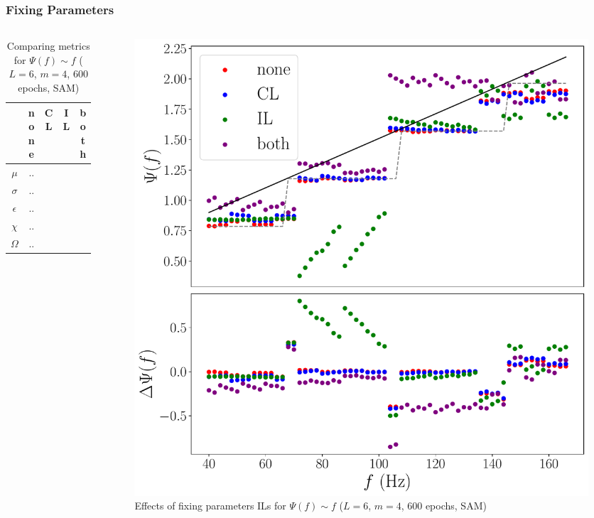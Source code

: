 \documentclass{beamer}
\begin{document}
\begin{frame}
\frametitle{Fixing Parameters}
\begin{columns}
\begin{column}{0.5\textwidth}
\begin{table}
\begin{tabular}{c || c| c | c| c }
&none & CL & IL & both \\ \hline \hline 
$\mu$ & ..   \\
$\sigma$ & ..  \\
$\epsilon$  & .. \\
$\chi$ & .. \\ \hline 
$\Omega$ & .. 
\end{tabular}
\caption{Comparing metrics for $\Psi(f) \sim f$ ($L=6$, $m=4$, 600 epochs, SAM)}
\end{table}
\end{column}
\begin{column}{0.5\textwidth}
\begin{figure}
\centering 
\includegraphics[width=\textwidth]{im/phase_RP_comp_linear_m4}
\caption{Effects of fixing parameters ILs for $\Psi(f) \sim f$ ($L=6$, $m=4$, 600 epochs, SAM)}
\end{figure}
\end{column}
\end{columns}
\end{frame}
\end{document}
